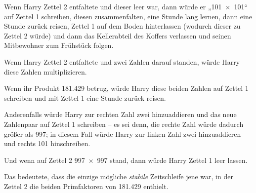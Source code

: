 Wenn Harry Zettel 2 entfaltete und dieser leer war, dann würde er „101~$\times$~101“ auf Zettel 1 schreiben, diesen zusammenfalten, eine Stunde lang lernen, dann eine Stunde zurück reisen, Zettel 1 auf dem Boden hinterlassen (wodurch dieser zu Zettel 2 würde) und dann das Kellerabteil des Koffers verlassen und seinen Mitbewohner zum Frühstück folgen.

Wenn Harry Zettel 2 entfaltete und zwei Zahlen darauf standen, würde Harry diese Zahlen multiplizieren.

Wenn ihr Produkt 181.429 betrug, würde Harry diese beiden Zahlen auf Zettel 1 schreiben und mit Zettel 1 eine Stunde zurück reisen.

Anderenfalls würde Harry zur rechten Zahl zwei hinzuaddieren und das neue Zahlenpaar auf Zettel 1 schreiben – es sei denn, die rechte Zahl würde dadurch größer als 997; in diesem Fall würde Harry zur linken Zahl zwei hinzuaddieren und rechts 101 hinschreiben.

Und wenn auf Zettel 2 997~$\times$~997 stand, dann würde Harry Zettel 1 leer lassen.

Das bedeutete, dass die einzige mögliche \emph{stabile} Zeitschleife jene war, in der Zettel 2 die beiden Primfaktoren von 181.429 enthielt.

